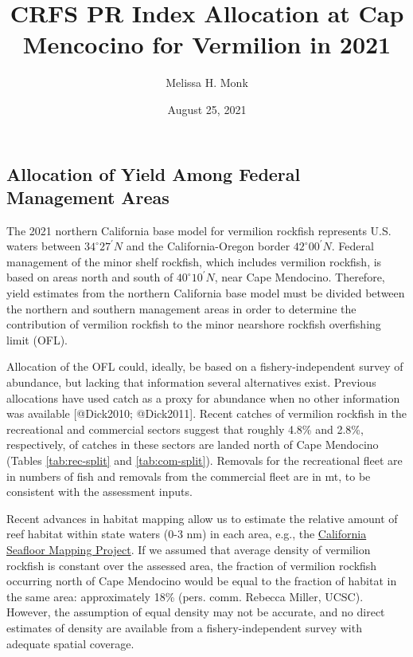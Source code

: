 \documentclass[
]{article}
\title{CRFS PR Index Allocation at Cap Mencocino for Vermilion in 2021}
\author{Melissa H. Monk}
\date{August 25, 2021}
\begin{document}
\maketitle

{
\setcounter{tocdepth}{2}
\tableofcontents
}
\newcommand\CapeM{$40^\circ 10^\prime N$}
\newcommand\PtC{$34^\circ 27^\prime N$}
\newcommand\CAOR{$42^\circ 00^\prime N$}

\hypertarget{allocation-of-yield-among-federal-management-areas}{%
\subsection{Allocation of Yield Among Federal Management Areas}\label{allocation-of-yield-among-federal-management-areas}}

The 2021 northern California base model for vermilion rockfish represents U.S.
waters between $34^\circ 27^\prime N$ and the California-Oregon border $42^\circ 00^\prime N$. Federal management of
the minor shelf rockfish, which includes vermilion rockfish, is based on areas north and south of $40^\circ 10^\prime N$,
near Cape Mendocino. Therefore, yield estimates from the northern California base
model must be divided between the northern and southern management areas in order
to determine the contribution of vermilion rockfish to the minor nearshore rockfish overfishing limit (OFL).

Allocation of the OFL could, ideally, be based on a fishery-independent survey of
abundance, but lacking that information several alternatives exist. Previous
allocations have used catch as a proxy for abundance when no other information
was available {[}@Dick2010; @Dick2011{]}. Recent catches of vermilion rockfish in the recreational
and commercial sectors suggest that roughly 4.8\% and 2.8\%, respectively, of catches
in these sectors are landed north of Cape Mendocino (Tables \ref{tab:rec-split} and \ref{tab:com-split}). Removals for the recreational fleet are in numbers of fish and removals
from the commercial fleet are in mt, to be consistent with the assessment inputs.

Recent advances in habitat mapping allow us to estimate the relative amount of reef
habitat within state waters (0-3 nm) in each area, e.g., the \href{https://walrus.wr.usgs.gov/mapping/csmp/}{California Seafloor Mapping Project}.
If we assumed that average density of vermilion rockfish is constant over the assessed area,
the fraction of vermilion rockfish occurring north of Cape Mendocino would be equal to the
fraction of habitat in the same area: approximately 18\% (pers. comm. Rebecca Miller, UCSC). However, the assumption of equal density may not be accurate, and no direct estimates of
density are available from a fishery-independent survey with adequate spatial coverage.
\end{document}
